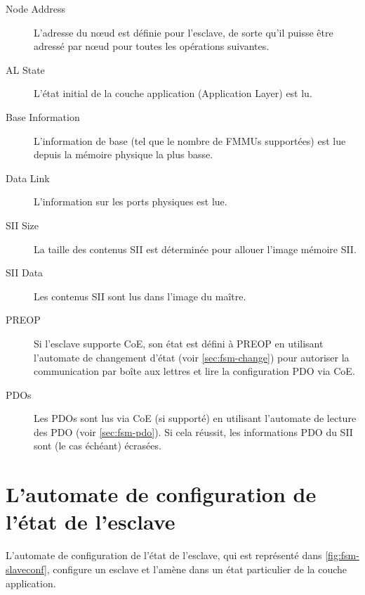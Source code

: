 \documentclass[a4paper,12pt,BCOR=6mm,bibtotoc,idxtotoc]{scrbook}
\begin{document}
\begin{description}

\item[Node Address] L'adresse du n\oe{}ud est d\'efinie pour l'esclave,
  de sorte qu'il puisse \^etre adress\'e par n\oe{}ud pour toutes les
  op\'erations suivantes.

\item[AL State] L'\'etat initial de la couche application
  (Application Layer) est lu.

\item[Base Information] L'information de base (tel que le nombre de
  FMMUs support\'ees) est lue depuis la m\'emoire physique la plus basse.

\item[Data Link] L'information sur les ports physiques est lue.

\item[SII Size] La taille des contenus SII est d\'etermin\'ee pour allouer
  l'image m\'emoire SII.

\item[SII Data] Les contenus SII sont lus dans l'image du ma\^itre.

\item[PREOP] Si l'esclave supporte CoE, son \'etat est d\'efini \`a PREOP en
  utilisant l'automate de changement d'\'etat (voir
  \autoref{sec:fsm-change}) pour autoriser la communication par bo\^ite
  aux lettres et lire la configuration PDO via CoE.

\item[PDOs] Les PDOs sont lus via CoE (si support\'e) en utilisant
  l'automate de lecture des PDO (voir \autoref{sec:fsm-pdo}). Si cela
  r\'eussit, les informations PDO du SII sont (le cas \'ech\'eant) \'ecras\'ees.

\end{description}


\section{L'automate de configuration de l'\'etat de l'esclave}
\label{sec:fsm-conf}

L'automate de configuration de l'\'etat de l'esclave, qui est
repr\'esent\'e dans \autoref{fig:fsm-slaveconf}, configure un esclave
et l'am\`ene dans un \'etat particulier de la couche application.
\end{document}
